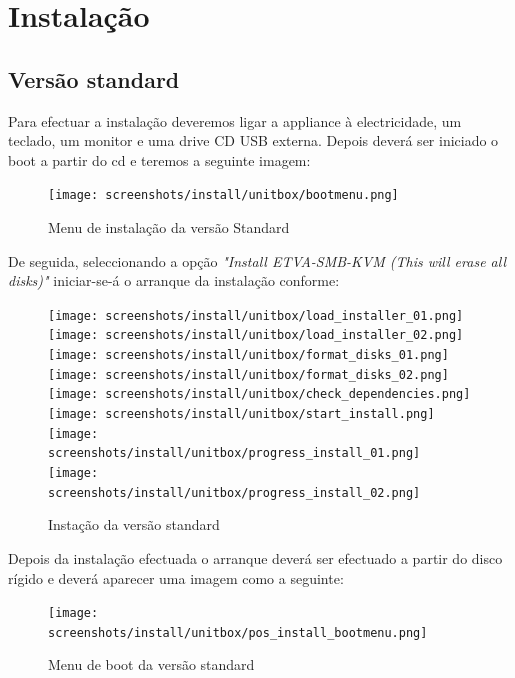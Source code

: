 \pagebreak
\chapter{\textsf{Instalação}}
\label{chp:installation}
\section{Versão standard}

Para efectuar a instalação deveremos ligar a appliance à electricidade, um teclado, um monitor e uma drive CD USB externa.
Depois deverá ser iniciado o boot a partir do cd e teremos a seguinte imagem:

\begin{figure}[H]
	\begin{center}
	\texttt{[image: screenshots/install/unitbox/bootmenu.png]}
	\caption{Menu de instalação da versão Standard}
	\label{fig:boot_install_screen_standard}
	\end{center}
\end{figure}

De seguida, seleccionando a opção \emph{"Install ETVA-SMB-KVM (This will erase all disks)"} iniciar-se-á o arranque da instalação conforme:

\begin{figure}[H]
	\begin{center}
	\texttt{[image: screenshots/install/unitbox/load\_installer\_01.png]}
	\texttt{[image: screenshots/install/unitbox/load\_installer\_02.png]}
	\texttt{[image: screenshots/install/unitbox/format\_disks\_01.png]}
	\texttt{[image: screenshots/install/unitbox/format\_disks\_02.png]}
	\texttt{[image: screenshots/install/unitbox/check\_dependencies.png]}
	\texttt{[image: screenshots/install/unitbox/start\_install.png]}
	\texttt{[image: screenshots/install/unitbox/progress\_install\_01.png]}
	\texttt{[image: screenshots/install/unitbox/progress\_install\_02.png]}
\caption{Instação da versão standard}
	\label{fig:installation_standard_02}
	\end{center}
\end{figure}

Depois da instalação efectuada o arranque deverá ser efectuado a partir do disco rígido e deverá aparecer uma imagem como a seguinte:

\begin{figure}[H]
	\begin{center}
	\texttt{[image: screenshots/install/unitbox/pos\_install\_bootmenu.png]}
	\caption{Menu de boot da versão standard}
	\label{fig:boot_screen_standard}
	\end{center}
\end{figure}

